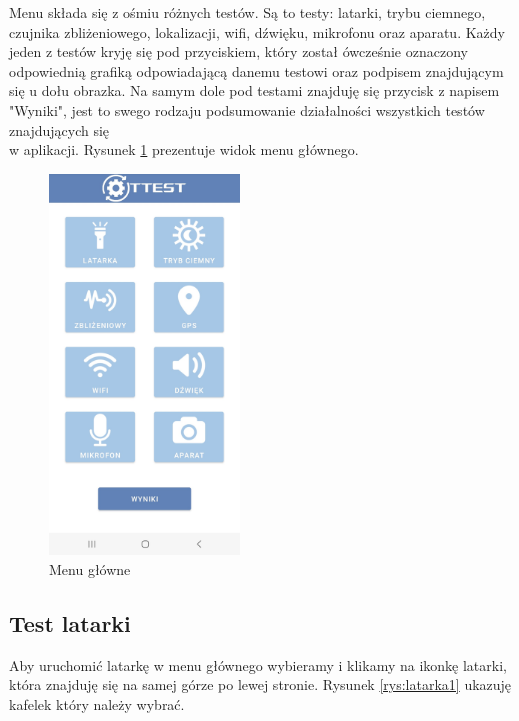 \newpage


Menu składa się z ośmiu różnych testów. Są to testy: latarki, trybu ciemnego, czujnika zbliżeniowego, lokalizacji, wifi, dźwięku, mikrofonu oraz aparatu. Każdy jeden z testów kryję się pod przyciskiem, który został ówcześnie oznaczony odpowiednią grafiką odpowiadającą danemu testowi oraz podpisem znajdującym się u dołu obrazka. Na samym dole pod testami znajduję się przycisk z napisem "Wyniki", jest to swego rodzaju podsumowanie działalności wszystkich testów znajdujących się \\ w aplikacji. Rysunek \ref{rys:menu1} prezentuje widok menu głównego.

\begin{figure}[!hbt]
	\begin{center}
		\includegraphics[angle=360, width=0.45\textwidth]{rys/punkt6/menu1.jpg}
		\caption{Menu główne}
		\label{rys:menu1}
	\end{center}
\end{figure}

\newpage


\subsection{Test latarki} 

\hspace{0.60cm}Aby uruchomić latarkę w menu głównego wybieramy i klikamy na ikonkę latarki, która znajduję się na samej górze po lewej stronie. Rysunek \ref{rys:latarka1} ukazuję kafelek który należy wybrać. 

